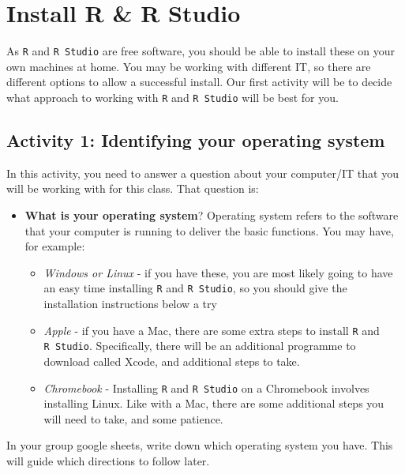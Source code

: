 \documentclass[
]{book}
\providecommand{\tightlist}{%
  \setlength{\itemsep}{0pt}\setlength{\parskip}{0pt}}
\begin{document}
\hypertarget{install-r-r-studio}{%
\section{Install R \& R Studio}\label{install-r-r-studio}}

As \texttt{R} and \texttt{R\ Studio} are free software, you should be able to install these on your own machines at home. You may be working with different IT, so there are different options to allow a successful install. Our first activity will be to decide what approach to working with \texttt{R} and \texttt{R\ Studio} will be best for you.

\hypertarget{activity-1-identifying-your-operating-system}{%
\subsection{Activity 1: Identifying your operating system}\label{activity-1-identifying-your-operating-system}}

In this activity, you need to answer a question about your computer/IT that you will be working with for this class. That question is:

\begin{itemize}
\item
  \textbf{What is your operating system}? Operating system refers to the software that your computer is running to deliver the basic functions. You may have, for example:

  \begin{itemize}
  \tightlist
  \item
    \emph{Windows or Linux} - if you have these, you are most likely going to have an easy time installing \texttt{R} and \texttt{R\ Studio}, so you should give the installation instructions below a try
  \item
    \emph{Apple} - if you have a Mac, there are some extra steps to install \texttt{R} and \texttt{R\ Studio}. Specifically, there will be an additional programme to download called Xcode, and additional steps to take.\\
  \item
    \emph{Chromebook} - Installing \texttt{R} and \texttt{R\ Studio} on a Chromebook involves installing Linux. Like with a Mac, there are some additional steps you will need to take, and some patience.
  \end{itemize}
\end{itemize}

In your group google sheets, write down which operating system you have. This will guide which directions to follow later.
\end{document}
